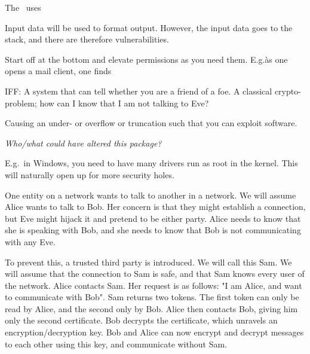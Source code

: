 \begin{definition}
The~ uses 
\end{definition}

\begin{definition}
	Input data will be used to format output. However, the input data
	goes to the stack, and there are therefore vulnerabilities.
\end{definition}

\begin{definition}
	Start off at the bottom and elevate permissions as you need them.
	E.g.\` as one opens a mail client, one finds 
\end{definition}

\begin{definition}{IFF:}\label{iff}
	A system that can tell whether you are a friend of a foe.
	A classical crypto-problem; how can I know that I am not talking to Eve?
\end{definition}

\begin{definition}
	Causing an under- or overflow or truncation such that you can 
	exploit software.
\end{definition}

\begin{definition}[Integrity]
	\textit{Who/what could have altered this package?}
\end{definition}

\begin{definition}
	E.g.\ in Windows, you need to have many drivers run as root in the kernel.
	This will naturally open up for more security holes. 
\end{definition}

\begin{definition}\label{keydistribution}
	One entity on a network wants to talk to another in a network. 
	We will assume Alice wants to talk to Bob.
	Her concern is that they might establish a connection,
	but Eve might hijack it and pretend to be either party. Alice needs to know
	that she is speaking with Bob, and she needs to know that Bob is not 
	communicating with any Eve.

	To prevent this, a trusted third party is introduced. We will call this Sam.
	We will assume that the connection to Sam is safe, and that Sam knows 
	every user of the network.
	Alice contacts Sam. Her request is as follows: "I am Alice, and want to 
	communicate with Bob". Sam returns two tokens. The first token 
	can only be read by Alice, and the second only by Bob. Alice then contacts 
	Bob, giving him only the second certificate. Bob decrypts the certificate,
	which unravels an encryption/decryption key. Bob and Alice can now 
	encrypt and decrypt messages to each other using this key, and communicate
	without Sam.

\end{definition}

